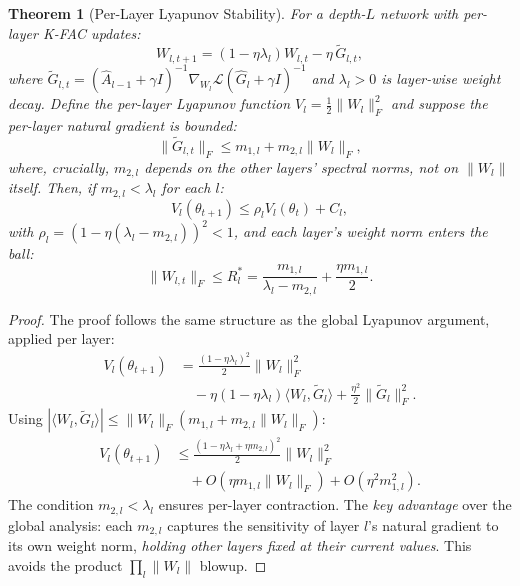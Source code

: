 \documentclass{article}
\providecommand{\norm}[1]{\lVert #1 \rVert}
\theoremstyle{plain}
\newtheorem{theorem}{Theorem}
\theoremstyle{definition}
\theoremstyle{remark}
\begin{document}
\begin{theorem}[Per-Layer Lyapunov Stability]
\label{thm:lyapunov_layer}
For a depth-$L$ network with per-layer K-FAC updates:
\begin{equation}
    W_{l,t+1} = (1 - \eta\lambda_l)W_{l,t} - \eta\,\tilde{G}_{l,t},
\end{equation}
where $\tilde{G}_{l,t} = (\hat{A}_{l-1} + \gamma I)^{-1}\nabla_{W_l}\mathcal{L}(\hat{G}_l + \gamma I)^{-1}$ and $\lambda_l > 0$ is layer-wise weight decay. Define the per-layer Lyapunov function $V_l = \frac{1}{2}\norm{W_l}_F^2$ and suppose the per-layer natural gradient is bounded:
\begin{equation}
\label{eq:per_layer_bound}
    \norm{\tilde{G}_{l,t}}_F \leq m_{1,l} + m_{2,l}\norm{W_l}_F,
\end{equation}
where, crucially, $m_{2,l}$ depends on the \emph{other layers' spectral norms}, not on $\norm{W_l}$ itself. Then, if $m_{2,l} < \lambda_l$ for each $l$:
\begin{equation}
    V_l(\theta_{t+1}) \leq \rho_l V_l(\theta_t) + C_l,
\end{equation}
with $\rho_l = (1 - \eta(\lambda_l - m_{2,l}))^2 < 1$, and each layer's weight norm enters the ball:
\begin{equation}
\label{eq:per_layer_R}
    \norm{W_{l,t}}_F \leq R_l^* = \frac{m_{1,l}}{\lambda_l - m_{2,l}} + \frac{\eta m_{1,l}}{2}.
\end{equation}
\end{theorem}

\begin{proof}
The proof follows the same structure as the global Lyapunov argument, applied per layer:
\begin{align}
    V_l(\theta_{t+1}) &= \tfrac{(1\!-\!\eta\lambda_l)^2}{2}\norm{W_l}_F^2 \nonumber \\
    &\quad - \eta(1\!-\!\eta\lambda_l)\langle W_l, \tilde{G}_l\rangle + \tfrac{\eta^2}{2}\norm{\tilde{G}_l}_F^2.
\end{align}
Using $|\langle W_l, \tilde{G}_l\rangle| \leq \norm{W_l}_F(m_{1,l} + m_{2,l}\norm{W_l}_F)$:
\begin{align}
    V_l(\theta_{t+1}) &\leq \frac{(1\!-\!\eta\lambda_l\!+\!\eta m_{2,l})^2}{2}\norm{W_l}_F^2 \nonumber \\
    &\quad + O(\eta m_{1,l}\norm{W_l}_F) + O(\eta^2 m_{1,l}^2).
\end{align}
The condition $m_{2,l} < \lambda_l$ ensures per-layer contraction. The \emph{key advantage} over the global analysis: each $m_{2,l}$ captures the sensitivity of layer $l$'s natural gradient to its own weight norm, \emph{holding other layers fixed at their current values}. This avoids the product $\prod_l \norm{W_l}$ blowup.
\end{proof}
\end{document}
